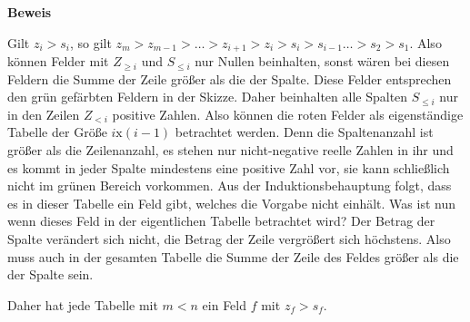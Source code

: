 \documentclass[10pt, a4paper]{amsart}
\makeatletter
\renewcommand\proofname{Beweis}
\renewenvironment{proof}[1][\proofname]{\par
\pushQED{\qed}%
\normalfont \topsep6\p@\@plus6\p@\relax
\trivlist
\item\relax
{\bfseries#1}\hspace\labelsep\ignorespaces
}{%
\popQED\endtrivlist\@endpefalse
}
\makeatother
\begin{document}
\begin{proof}
\begin{itemize}[itemsep=2ex]
\begin{figure}[h]
      \caption{}
    \end{figure}

    Gilt $z_i>s_i$, so gilt
    $z_m>z_{m-1}>\ldots>z_{i+1}>z_i>s_i>s_{i-1}\ldots>s_2>s_1$. Also können
    Felder mit $Z_{\geq i}$ und $S_{\leq i}$ nur Nullen beinhalten, sonst wären
    bei diesen Feldern die Summe der Zeile größer als die der Spalte. Diese
    Felder entsprechen den grün gefärbten Feldern in der Skizze. Daher
    beinhalten alle Spalten $S_{\leq i}$ nur in den Zeilen $Z_{<i}$ positive
    Zahlen. Also können die roten Felder als eigenständige Tabelle der Größe
    $i\text{x}(i-1)$ betrachtet werden. Denn die Spaltenanzahl ist größer als
    die Zeilenanzahl, es stehen nur nicht-negative reelle Zahlen in ihr und es
    kommt in jeder Spalte mindestens eine positive Zahl vor, sie kann
    schließlich nicht im grünen Bereich vorkommen. Aus der Induktionsbehauptung
    folgt, dass es in dieser Tabelle ein Feld gibt, welches die Vorgabe nicht
    einhält. Was ist nun wenn dieses Feld in der eigentlichen Tabelle betrachtet
    wird? Der Betrag der Spalte verändert sich nicht, die Betrag der Zeile
    vergrößert sich höchstens. Also muss auch in der gesamten Tabelle die Summe
    der Zeile des Feldes größer als die der Spalte sein.

    Daher hat jede Tabelle mit $m<n$ ein Feld $f$ mit $z_f>s_f$.
  \end{itemize}
\end{proof}
\end{document}
